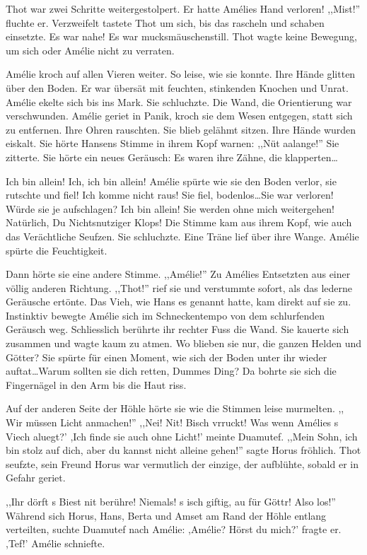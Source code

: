 \documentclass[11pt,titlepage,a5paper]{book}
\newcommand{\am}{Amélie }
\begin{document}
Thot war zwei Schritte weitergestolpert. Er hatte Amélies Hand verloren! ,,Mist!'' fluchte er. Verzweifelt tastete Thot um sich, bis das rascheln und schaben einsetzte. Es war nahe! Es war mucksmäuschenstill. Thot wagte keine Bewegung, um sich oder \am nicht zu verraten. 

Amélie kroch auf allen Vieren weiter. So leise, wie sie konnte. Ihre Hände glitten über den Boden. Er war übersät mit feuchten, stinkenden Knochen und Unrat. Amélie ekelte sich bis ins Mark. Sie schluchzte. Die Wand, die Orientierung war verschwunden. \am geriet in Panik, kroch sie dem Wesen entgegen, statt sich zu entfernen. Ihre Ohren rauschten. Sie blieb gelähmt sitzen. Ihre Hände wurden eiskalt. Sie hörte Hansens Stimme in ihrem Kopf warnen: ,,Nüt aalange!'' Sie zitterte. Sie hörte ein neues Geräusch: Es waren ihre Zähne, die klapperten\dots  

Ich bin allein! Ich, ich bin allein! Amélie spürte wie sie den Boden verlor, sie rutschte und fiel! Ich komme nicht raus! Sie fiel, bodenlos\dots Sie war verloren! Würde sie je aufschlagen? Ich bin allein! Sie werden ohne mich weitergehen! Natürlich, Du Nichtsnutziger Klops! Die Stimme kam aus ihrem Kopf, wie auch das Verächtliche Seufzen. Sie schluchzte. Eine Träne lief über ihre Wange. Amélie spürte die Feuchtigkeit. 


Dann hörte sie eine andere Stimme. ,,Amélie!'' Zu Amélies Entsetzten aus einer völlig anderen Richtung. ,,Thot!'' rief sie und verstummte sofort, als das lederne Geräusche ertönte. Das Vieh, wie Hans es genannt hatte, kam direkt auf sie zu. Instinktiv bewegte Amélie sich im Schneckentempo von dem schlurfenden Geräusch weg. Schliesslich berührte ihr rechter Fuss die Wand. Sie kauerte sich zusammen und wagte kaum zu atmen. Wo blieben sie nur, die ganzen Helden und Götter? Sie spürte für einen Moment, wie sich der Boden unter ihr wieder auftat\dots Warum sollten sie dich retten, Dummes Ding? Da bohrte sie sich die Fingernägel in den Arm bis die Haut riss.

Auf der anderen Seite der Höhle hörte sie wie die Stimmen leise murmelten. ,, Wir müssen Licht anmachen!'' ,,Nei! Nit! Bisch vrruckt! Was wenn Amélies s Viech aluegt?' ,Ich finde sie auch ohne Licht!' meinte Duamutef. ,,Mein Sohn, ich bin stolz auf dich, aber du kannst nicht alleine gehen!'' sagte Horus fröhlich. Thot seufzte, sein Freund Horus war vermutlich der einzige, der aufblühte, sobald er in Gefahr geriet.

,,Ihr dörft s Biest nit berühre! Niemals! s isch giftig, au für Göttr! Also los!'' Während sich Horus, Hans, Berta und Amset am Rand der Höhle entlang verteilten, suchte Duamutef nach Amélie: ,Amélie? Hörst du mich?' fragte er. ,Tef!' Amélie schniefte. 
\end{document}
